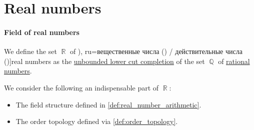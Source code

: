 \section{Real numbers}\label{sec:real_numbers}

\paragraph{Field of real numbers}

\begin{definition}\label{def:real_numbers}
  We define the set \( \BbbR \) of \term[bg=реални числа (\cite[ch. I]{Тагамлицки1971ДиференциалноСмятане}), ru=вещественные числа (\cite[\S 3]{Фихтенгольц1968ОсновыАнализаТом1}) / действительные числа (\cite[def. 25.1]{Проскуряков1951ТеоретическиеОсновыАрифметики})]{real numbers} as the \hyperref[def:lower_cut_completion]{unbounded lower cut completion} of the set \( \BbbQ \) of \hyperref[def:rational_numbers]{rational numbers}.
\end{definition}
\begin{comments}
  \item We consider the following an indispensable part of \( \BbbR \):
  \begin{itemize}
    \item The field structure defined in \cref{def:real_number_arithmetic}.
    \item The order topology defined via \cref{def:order_topology}.
  \end{itemize}
\end{comments}

